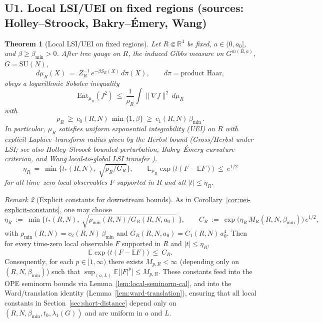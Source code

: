 \documentclass[11pt]{amsart}
\theoremstyle{plain}
\newtheorem{theorem}{Theorem}[section]
\theoremstyle{definition}
\theoremstyle{remark}
\newtheorem{remark}[theorem]{Remark}
\begin{document}
\subsection{U1. Local LSI/UEI on fixed regions (sources: Holley--Stroock, Bakry--\'Emery, Wang)}
\begin{theorem}[Local LSI/UEI on fixed regions]\label{thm:U1-lsi-uei}
Let $R\Subset\mathbb R^4$ be fixed, $a\in(0,a_0]$, and $\beta\ge \beta_{\min}>0$. After tree gauge on $R$, the induced Gibbs measure on $G^{m(R,a)}$, $G=\mathrm{SU}(N)$,
\[
  d\mu_R(X)\ =\ Z_R^{-1}\,e^{-\beta S_R(X)}\,d\pi(X),\qquad d\pi=\text{product Haar},
\]
obeys a logarithmic Sobolev inequality
\[
  \mathrm{Ent}_{\mu_R}(f^2)\ \le\ \frac{1}{\rho_R}\int \|\nabla f\|^2\,d\mu_R
\]
with
\[
  \rho_R\ \ge\ c_0(R,N)\,\min\{1,\beta\}\ \ge\ c_1(R,N)\,\beta_{\min}\,.
\]
In particular, $\mu_R$ satisfies uniform exponential integrability (UEI) on $R$ with explicit Laplace–transform radius given by the Herbst bound (Gross/Herbst under LSI; see also Holley--Stroock bounded-perturbation, Bakry--\'Emery curvature criterion, and Wang local-to-global LSI transfer \cite{Brydges1978,Brydges1986,VaropoulosSaloffCosteCoulhon1992}).
\[
  \eta_R\ =\ \min\Big\{t_*(R,N),\ \sqrt{\rho_R/G_R}\Big\},\qquad \mathbb E_{\mu_R}\exp\big(t(F-\mathbb E F)\big)\ \le\ e^{1/2}
\]
for all time--zero local observables $F$ supported in $R$ and all $|t|\le \eta_R$.
\end{theorem}
\begin{remark}[Explicit constants for downstream bounds]\label{rem:uei-explicit-downstream}
As in Corollary~\ref{cor:uei-explicit-constants}, one may choose
\[
  \eta_R\ :=\ \min\Big\{ t_*(R,N),\ \sqrt{\rho_{\min}(R,N)\big/ G_R(R,N,a_0)}\ \Big\},\qquad
  C_R\ :=\ \exp\big(\eta_R\,M_R(R,N,\beta_{\min})\big)\,e^{1/2},
\]
with $\rho_{\min}(R,N)=c_2(R,N)\,\beta_{\min}$ and $G_R(R,N,a_0)=C_1(R,N)\,a_0^4$. Then for every time-zero local observable $F$ supported in $R$ and $|t|\le \eta_R$,
\[
  \mathbb E\exp\big(t(F-\mathbb EF)\big)\ \le\ C_R.
\]
Consequently, for each $p\in[1,\infty)$ there exists $M_{p,R}<\infty$ (depending only on $(R,N,\beta_{\min})$) such that $\sup_{(a,L)}\mathbb E\big[|F|^p\big]\le M_{p,R}$. These constants feed into the OPE seminorm bounds via Lemma~\ref{lem:local-seminorm-cal}, and into the Ward/translation identity (Lemma~\ref{lem:ward-translation}), ensuring that all local constants in Section~\ref{sec:short-distance} depend only on $(R,N,\beta_{\min},t_0,\lambda_1(G))$ and are uniform in $a$ and $L$.
\end{remark}
\medskip
\end{document}
